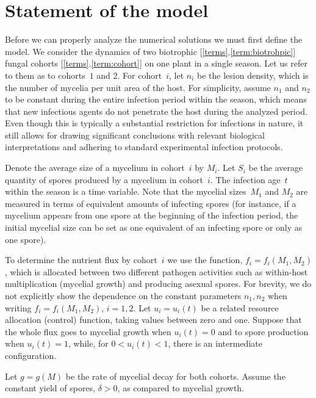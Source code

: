\documentclass[11pt]{amsart}
\begin{document}
\section{Statement of the model}
Before we can properly analyze the numerical solutions we must first define the model. We consider the dynamics of two biotrophic [\ref{terms}.\ref{term:biotrohpic}] fungal cohorts [\ref{terms}.\ref{term:cohort}] on one plant in a single season.  Let us refer to them as to cohorts~$ 1 $ and $ 2 $. For
cohort~$ i $, let $ n_i $ be the lesion density, which is the number of mycelia
per unit area of the host. For simplicity, assume $ n_1 $ and $ n_2 $ to be
constant during the entire infection period within the season, which means that
new infectious agents do not penetrate the host during the analyzed period.
Even though this is typically a substantial restriction for infections in
nature, it still allows for drawing significant conclusions with relevant
biological interpretations and adhering to standard experimental infection
protocols.

Denote the average size of a mycelium in cohort~$ i $ by $ M_i $. Let $ S_i $
be the average quantity of spores produced by a mycelium in cohort~$ i $. The
infection age~$ t $ within the season is a time variable. Note that the
mycelial sizes~$ M_1 $ and $ M_2 $ are measured in terms of equivalent amounts
of infecting spores (for instance, if a mycelium appears from one spore at the
beginning of the infection period, the initial mycelial size can be set as one
equivalent of an infecting spore or only as one spore).

To determine the nutrient flux %
by cohort~$ i $ we use the function,
$ f_i = f_i(M_1, M_2) $, which is allocated between two different pathogen
activities such as within-host multiplication (mycelial growth) and producing
asexual spores. For brevity, we do not explicitly show the dependence on the
constant parameters $ n_1, n_2 $ when writing $ f_i = f_i(M_1, M_2) $,
$ i = 1,2 $. Let $ u_i = u_i(t) $ be a related resource allocation (control)
function, taking values between zero and one. Suppose that the whole flux goes
to mycelial growth when $ u_i(t) = 0 $ and to spore production when
$ u_i(t) = 1 $, while, for $ 0 < u_i(t) < 1 $, there is an intermediate
configuration.

Let $ g = g(M) $ be the rate of mycelial decay for both cohorts. Assume the constant yield of spores, $ \delta > 0 $, as compared to mycelial growth. %
\end{document}
